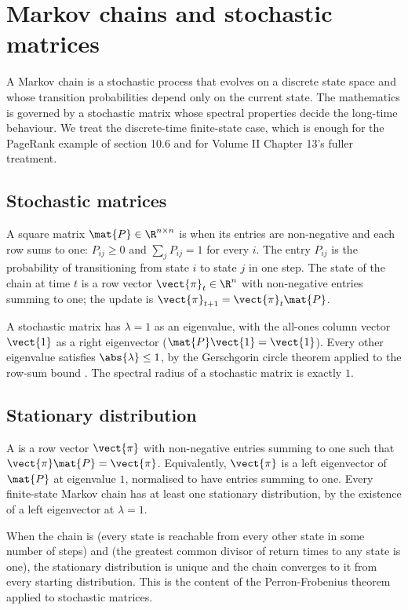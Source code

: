 \section{Markov chains and stochastic matrices}

A Markov chain is a stochastic process that evolves on a discrete
state space and whose transition probabilities depend only on the
current state. The mathematics is governed by a stochastic matrix
whose spectral properties decide the long-time behaviour. We treat
the discrete-time finite-state case, which is enough for the
PageRank example of section 10.6 and for Volume II Chapter 13's
fuller treatment.

\subsection{Stochastic matrices}

A square matrix $\mat{P} \in \R^{n \times n}$ is 
when its entries are non-negative and each row sums to one:
$P_{ij} \geq 0$ and $\sum_{j} P_{ij} = 1$ for every $i$. The entry
$P_{ij}$ is the probability of transitioning from state $i$ to
state $j$ in one step. The state of the chain at time $t$ is a row
vector $\vect{\pi}_{t} \in \R^{n}$ with non-negative entries summing
to one; the update is $\vect{\pi}_{t+1} = \vect{\pi}_{t} \mat{P}$.

A stochastic matrix has $\lambda = 1$ as an eigenvalue, with the
all-ones column vector $\vect{1}$ as a right eigenvector
($\mat{P} \vect{1} = \vect{1}$). Every other eigenvalue satisfies
$\abs{\lambda} \leq 1$, by the Gerschgorin circle theorem applied
to the row-sum bound \cite[ch.~6]{text:strang2016}. The spectral
radius of a stochastic matrix is exactly $1$.

\subsection{Stationary distribution}

A  is a row vector $\vect{\pi}$
with non-negative entries summing to one such that $\vect{\pi}
\mat{P} = \vect{\pi}$. Equivalently, $\vect{\pi}$ is a left
eigenvector of $\mat{P}$ at eigenvalue $1$, normalised to have
entries summing to one. Every finite-state Markov chain has at
least one stationary distribution, by the existence of a left
eigenvector at $\lambda = 1$.

When the chain is  (every state is reachable
from every other state in some number of steps) and
 (the greatest common divisor of return times to
any state is one), the stationary distribution is unique and the
chain converges to it from every starting distribution. This is the
content of the Perron-Frobenius theorem applied to stochastic
matrices.

